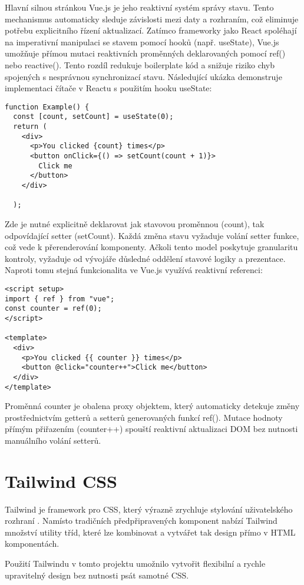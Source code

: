 Hlavní silnou stránkou Vue.js je jeho reaktivní systém správy stavu. Tento mechanismus automaticky sleduje závislosti mezi daty a rozhraním, což eliminuje potřebu explicitního řízení aktualizací\cite{vuejsVuejsDocs}.
Zatímco frameworky jako React spoléhají na imperativní manipulaci se stavem pomocí hooků (např. useState), Vue.js umožňuje přímou mutaci reaktivních proměnných deklarovaných pomocí ref() nebo reactive(). Tento rozdíl redukuje boilerplate kód a snižuje riziko chyb spojených s nesprávnou synchronizací stavu. Následující ukázka demonstruje implementaci čítače v Reactu s použitím hooku useState:
\begin{lstlisting}
function Example() {
  const [count, setCount] = useState(0);
  return (
    <div>
      <p>You clicked {count} times</p>
      <button onClick={() => setCount(count + 1)}>
        Click me
      </button>
    </div>

  );
\end{lstlisting}
Zde je nutné explicitně deklarovat jak stavovou proměnnou (count), tak odpovídající setter (setCount). Každá změna stavu vyžaduje volání setter funkce, což vede k přerenderování komponenty. Ačkoli tento model poskytuje granularitu kontroly, vyžaduje od vývojáře důsledné oddělení stavové logiky a prezentace. Naproti tomu stejná funkcionalita ve Vue.js využívá reaktivní referenci:
\begin{lstlisting}
<script setup>
import { ref } from "vue";
const counter = ref(0);
</script>

<template>
  <div>
    <p>You clicked {{ counter }} times</p>
    <button @click="counter++">Click me</button>
  </div>
</template>
\end{lstlisting}
Proměnná counter je obalena proxy objektem, který automaticky detekuje změny prostřednictvím getterů a setterů generovaných funkcí ref(). Mutace hodnoty přímým přiřazením (counter++) spouští reaktivní aktualizaci DOM bez nutnosti manuálního volání setterů.

\section{Tailwind CSS}
Tailwind je framework pro CSS, který výrazně zrychluje stylování uživatelského rozhraní \cite{tailwindcssTailwindRapidly}. Namísto tradičních předpřipravených komponent nabízí Tailwind množství utility tříd, které lze kombinovat a vytvářet tak design přímo v HTML komponentách.

Použití Tailwindu v tomto projektu umožnilo vytvořit flexibilní a rychle upravitelný design bez nutnosti psát samotné CSS.


